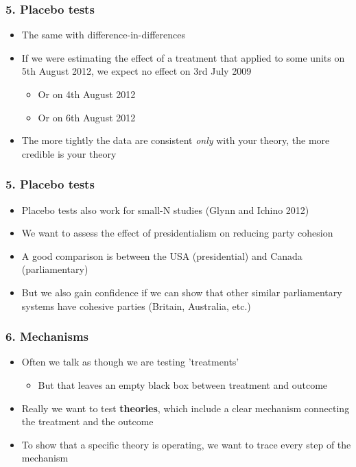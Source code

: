 \documentclass[xcolor=x11names,compress]{beamer}\usepackage[]{graphicx}\usepackage[]{color}
\renewcommand{\(}{\begin{columns}}
\renewcommand{\)}{\end{columns}}
\newcommand{\<}[1]{\begin{column}{#1}}
\renewcommand{\>}{\end{column}}
\begin{document}
\begin{frame}
\frametitle{5. Placebo tests}
\begin{itemize}
\item The same with difference-in-differences
\pause
\item If we were estimating the effect of a treatment that applied to some units on 5th August 2012, we expect no effect on 3rd July 2009
\pause
\begin{itemize}
\item Or on 4th August 2012
\pause
\item Or on 6th August 2012
\pause
\end{itemize}
\item The more tightly the data are consistent \textit{only} with your theory, the more credible is your theory
\end{itemize}
\end{frame}

\begin{frame}
\frametitle{5. Placebo tests}
\begin{itemize}
\item Placebo tests also work for small-N studies (Glynn and Ichino 2012)
\pause
\item We want to assess the effect of presidentialism on reducing party cohesion
\pause
\item A good comparison is between the USA (presidential) and Canada (parliamentary)
\pause
\item But we also gain confidence if we can show that other similar parliamentary systems have cohesive parties (Britain, Australia, etc.)
\end{itemize}
\end{frame}

\begin{frame}
\frametitle{6. Mechanisms}
\begin{itemize}
\item Often we talk as though we are testing 'treatments'
\pause
\begin{itemize}
\item But that leaves an empty black box between treatment and outcome
\pause
\end{itemize}
\item Really we want to test \textbf{theories}, which include a clear mechanism connecting the treatment and the outcome
\pause
\item To show that a specific theory is operating, we want to trace every step of the mechanism
\end{itemize}
\end{frame}
\end{document}
